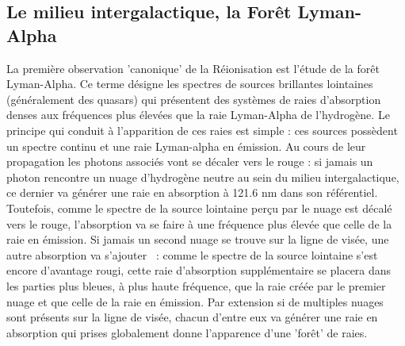 \subsection{Le milieu intergalactique, la Forêt Lyman-Alpha}
La première observation 'canonique' de la Réionisation est l'étude de la forêt Lyman-Alpha. Ce terme désigne les spectres de sources brillantes lointaines (généralement des quasars) qui présentent des systèmes de raies d'absorption denses aux fréquences plus élevées que la raie Lyman-Alpha de l'hydrogène. Le principe qui conduit à l'apparition de ces raies est simple : ces sources possèdent un spectre continu et une raie Lyman-alpha en émission. Au cours de leur propagation les photons associés vont se décaler vers le rouge : si jamais un photon rencontre un nuage d'hydrogène neutre au sein du milieu intergalactique, ce dernier va générer une raie en absorption à 121.6 nm dans son référentiel. Toutefois, comme le spectre de la source lointaine perçu par le nuage est décalé vers le rouge, l'absorption va se faire à une fréquence plus élevée que celle de la raie en émission. Si jamais un second nuage se trouve sur la ligne de visée, une autre absorption va s'ajouter ~: comme le spectre de la source lointaine s'est encore d'avantage rougi, cette raie d'absorption supplémentaire se placera dans les parties plus bleues, à plus haute fréquence, que la raie créée par le premier nuage et que celle de la raie en émission. Par extension si de multiples nuages sont présents sur la ligne de visée, chacun d'entre eux va générer une raie en absorption qui prises globalement donne l'apparence d'une 'forêt' de raies.

